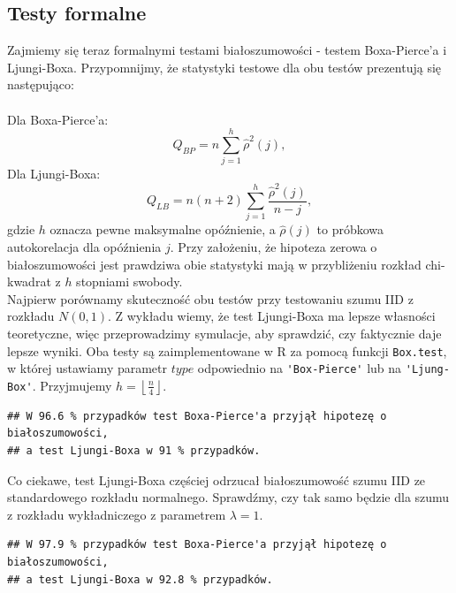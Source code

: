 \documentclass[10pt, a4paper]{article}\usepackage[]{graphicx}\usepackage[]{xcolor}
\makeatletter
\newenvironment{kframe}{%
 \def\at@end@of@kframe{}%
 \ifinner\ifhmode%
  \def\at@end@of@kframe{\end{minipage}}%
  \begin{minipage}{\columnwidth}%
 \fi\fi%
 \def\FrameCommand##1{\hskip\@totalleftmargin \hskip-\fboxsep
 \colorbox{shadecolor}{##1}\hskip-\fboxsep
     \hskip-\linewidth \hskip-\@totalleftmargin \hskip\columnwidth}%
 \MakeFramed {\advance\hsize-\width
   \@totalleftmargin\z@ \linewidth\hsize
   \@setminipage}}%
 {\par\unskip\endMakeFramed%
 \at@end@of@kframe}
\newenvironment{knitrout}{}{} %
\makeatother
\begin{document}
\subsection{Testy formalne} 
\def\lf{\left\lfloor}   
\def\rf{\right\rfloor}
Zajmiemy się teraz formalnymi testami białoszumowości - testem Boxa-Pierce'a i Ljungi-Boxa. Przypomnijmy, że statystyki testowe dla obu testów prezentują się następująco:\\
\\
Dla Boxa-Pierce'a:
$$Q_{BP}=n\sum_{j=1}^h\hat\rho^2(j),$$
Dla Ljungi-Boxa:
$$Q_{LB}=n(n+2)\sum_{j=1}^h\frac{\hat\rho^2(j)}{n-j},$$
gdzie $h$ oznacza pewne maksymalne opóźnienie, a $\hat\rho(j)$ to próbkowa autokorelacja dla opóźnienia $j$. Przy założeniu, że hipoteza zerowa o białoszumowości jest prawdziwa obie statystyki mają w przybliżeniu rozkład chi-kwadrat z $h$ stopniami swobody. \\
Najpierw porównamy skuteczność obu testów przy testowaniu szumu IID z rozkładu $N(0,1)$. Z wykładu wiemy, że test Ljungi-Boxa ma lepsze własności teoretyczne, więc przeprowadzimy symulacje, aby sprawdzić, czy faktycznie daje lepsze wyniki. Oba testy są zaimplementowane w R za pomocą funkcji \verb+Box.test+, w której ustawiamy parametr $type$ odpowiednio na \verb+'Box-Pierce'+ lub na \verb+'Ljung-Box'+. Przyjmujemy $h=\lf\frac{n}{4}\rf$.
\begin{knitrout}
\color{fgcolor}\begin{kframe}
\begin{verbatim}
## W 96.6 % przypadków test Boxa-Pierce'a przyjął hipotezę o białoszumowości,
## a test Ljungi-Boxa w 91 % przypadków.
\end{verbatim}
\end{kframe}
\end{knitrout}
Co ciekawe, test Ljungi-Boxa częściej odrzucał białoszumowość szumu IID ze standardowego rozkładu normalnego. Sprawdźmy, czy tak samo będzie dla szumu z rozkładu wykładniczego z parametrem $\lambda=1$.
\begin{knitrout}
\color{fgcolor}\begin{kframe}
\begin{verbatim}
## W 97.9 % przypadków test Boxa-Pierce'a przyjął hipotezę o białoszumowości,
## a test Ljungi-Boxa w 92.8 % przypadków.
\end{verbatim}
\end{kframe}
\end{knitrout}
\end{document}
